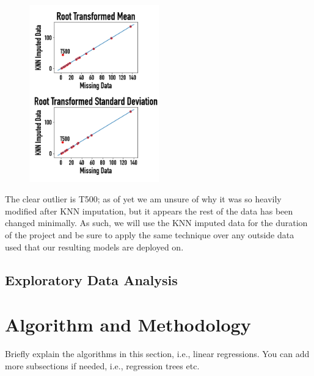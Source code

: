 \documentclass[fleqn,10pt]{SelfArx} %
\begin{document}
\begin{figure}[H]
\includegraphics[width=0.5\textwidth]{"plots/imputation_plot.png"} 
\end{figure}

The clear outlier is T500; as of yet we am unsure of why it was so heavily modified after KNN imputation, but it appears the rest of the data has been changed minimally. As such, we will use the KNN imputed data for the duration of the project and be sure to apply the same technique over any outside data used that our resulting models are deployed on.

\subsection{Exploratory Data Analysis}


\bigskip
\bigskip


\section{Algorithm and Methodology}

Briefly explain the algorithms in this section, i.e., linear regressions. You can add more subsections if needed, i.e., regression trees etc.


\bigskip
\bigskip
\end{document}
